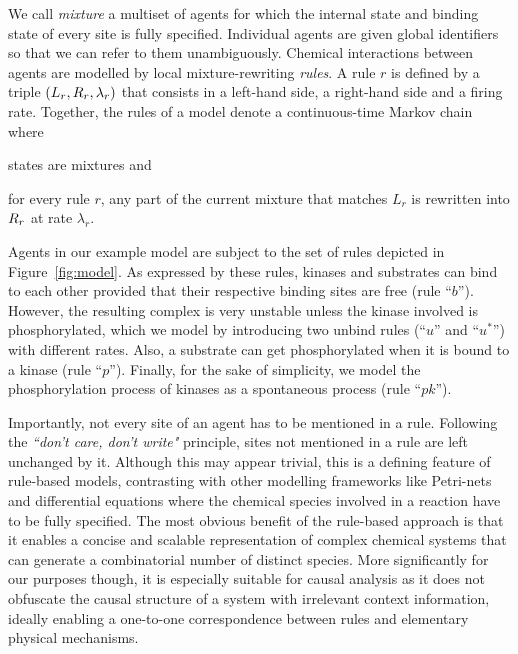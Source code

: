 We call \emph{mixture} a multiset of agents for which the internal
state and binding state of every site is fully specified.  Individual
agents are given global identifiers so that we can refer to them
unambiguously. 
\noindent
Chemical interactions between agents are modelled by local
mixture-rewriting \emph{rules}.  A rule $r$ is defined by a triple
$(L_{r}, R_{r}, \lambda_r)$ that consists in a left-hand side,
                 a right-hand side and a firing rate.
Together, the rules of a model denote a
continuous-time Markov chain where
\begin{inparaenum}[(i)]
\item states are mixtures and
\item for every rule $r$, any part of the current mixture that
  matches $L_r$ is rewritten into $R_{r}$ at rate $\lambda_r$.
\end{inparaenum}
Agents in our example model are subject to the set of rules depicted
in Figure~\ref{fig:model}. As expressed by these rules, kinases and
substrates can bind to each other provided that their respective
binding sites are free (rule ``$b$''). However, the resulting complex
is very unstable unless the kinase involved is phosphorylated, which
we model by introducing two unbind rules (``$u$'' and ``$u^{*}$'')
with different rates. Also, a substrate can get phosphorylated when it
is bound to a kinase (rule ``$p$''). Finally, for the sake of
simplicity, we model the phosphorylation process of kinases as a
spontaneous process (rule ``$pk$'').



Importantly, not every site of an agent has to be mentioned in a rule.
Following the \textit{``don't care, don't write"} principle, sites not
mentioned in a rule are left unchanged by it. Although this may appear
trivial, this is a defining feature of rule-based models, contrasting
with other modelling frameworks %
like Petri-nets and differential equations where the chemical species
involved in a reaction have to be fully specified. The most obvious
benefit of the rule-based approach is that it enables a concise and
scalable representation of complex chemical systems that can generate
a combinatorial number of distinct species. More significantly for our
purposes though, it is especially suitable for causal analysis as it
does not obfuscate the causal structure of a system with irrelevant
context information, ideally enabling a one-to-one correspondence
between rules and elementary physical mechanisms.

